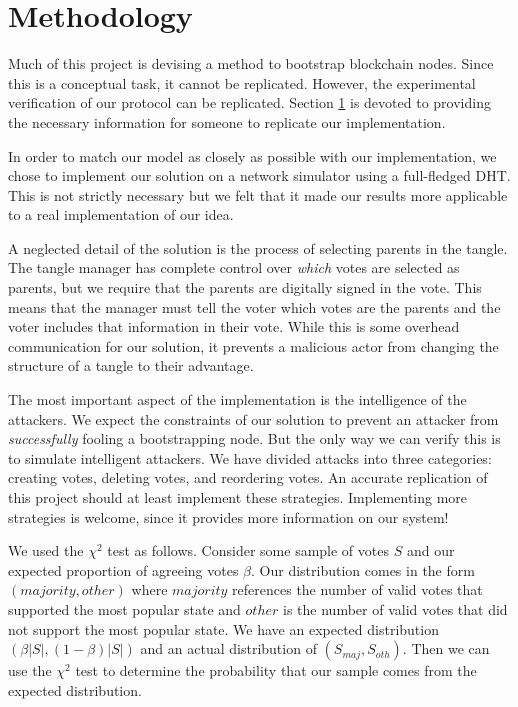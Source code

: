 \section{Methodology}
\label{sec:methodology}


Much of this project is devising a method to bootstrap blockchain nodes.
Since this is a conceptual task, it cannot be replicated.
However, the experimental verification of our protocol can be replicated.
Section \ref{sec:methodology} is devoted to providing the necessary information for someone to replicate our implementation.


In order to match our model as closely as possible with our implementation, we chose to implement our solution on a network simulator using a full-fledged DHT.
This is not strictly necessary but we felt that it made our results more applicable to a real implementation of our idea.


A neglected detail of the solution is the process of selecting parents in the tangle.
The tangle manager has complete control over \textit{which} votes are selected as parents, but we require that the parents are digitally signed in the vote.
This means that the manager must tell the voter which votes are the parents and the voter includes that information in their vote.
While this is some overhead communication for our solution, it prevents a malicious actor from changing the structure of a tangle to their advantage.


The most important aspect of the implementation is the intelligence of the attackers.
We expect the constraints of our solution to prevent an attacker from \textit{successfully} fooling a bootstrapping node.
But the only way we can verify this is to simulate intelligent attackers.
We have divided attacks into three categories: creating votes, deleting votes, and reordering votes.
An accurate replication of this project should at least implement these strategies.
Implementing more strategies is welcome, since it provides more information on our system!


We used the $\chi ^2$ test as follows.
Consider some sample of votes $S$ and our expected proportion of agreeing votes $\beta$.
Our distribution comes in the form $(majority, other)$ where $majority$ references the number of valid votes that supported the most popular state and $other$ is the number of valid votes that did not support the most popular state.
We have an expected distribution $(\beta|S|, (1-\beta)|S|)$ and an actual distribution of $(S_{maj}, S_{oth})$.
Then we can use the $\chi ^2$ test to determine the probability that our sample comes from the expected distribution.

